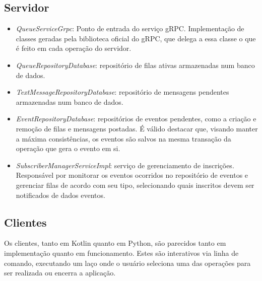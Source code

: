 \documentclass{article}
\begin{document}
    \subsection{Servidor}\label{subsec:server}

    \begin{itemize}
        \item \textit{QueueServiceGrpc}: Ponto de entrada do serviço gRPC. Implementação de classes geradas pela biblioteca oficial do gRPC, que delega a essa classe o que é feito em cada operação do servidor.

        \item \textit{QueueRepositoryDatabase}: repositório de filas ativas armazenadas num banco de dados.

        \item \textit{TextMessageRepositoryDatabase}: repositório de mensagens pendentes armazenadas num banco de dados.

        \item \textit{EventRepositoryDatabase}: repositórios de eventos pendentes, como a criação e remoção de filas e mensagens postadas.
        É válido destacar que, visando manter a máxima consistências, os eventos são salvos na mesma transação da operação que gera o evento em si.

        \item \textit{SubscriberManagerServiceImpl}: serviço de gerenciamento de inscrições.
        Responsável por monitorar os eventos ocorridos no repositório de eventos e gerenciar filas de acordo com seu tipo, selecionando quais inscritos devem ser notificados de dados eventos.

    \end{itemize}

    \subsection{Clientes}\label{subsec:clientes}

    Os clientes, tanto em Kotlin quanto em Python, são parecidos tanto em implementação quanto em funcionamento.
    Estes são interativos via linha de comando, executando um laço onde o usuário seleciona uma das operações para ser realizada ou encerra a aplicação.
\end{document}
